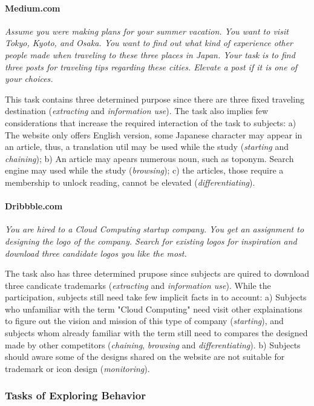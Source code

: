 \paragraph{Medium.com} \emph{Assume you were making plans for your summer vacation. 
        You want to visit Tokyo, Kyoto, and Osaka. You want to find out what kind of experience other people made 
        when traveling to these three places in Japan. Your task is to find three posts 
        for traveling tips regarding these cities. Elevate a post if it is one of your choices.}

This task contains three determined purpose since there are three fixed traveling 
destination (\emph{extracting} and \emph{information use}).
The task also implies few considerations that increase the required interaction of 
the task to subjects:
a) The website only offers English version, some Japanese character may appear in an article,
thus, a translation util may be used while the study (\emph{starting} and \emph{chaining});
b) An article may apears numerous noun, such as toponym. Search engine may used while the study (\emph{browsing});
c) the articles, those require a membership to unlock reading, cannot be elevated (\emph{differentiating}). 

\paragraph{Dribbble.com} \emph{You are hired to a Cloud Computing startup company. You get an assignment to 
        designing the logo of the company. Search for existing logos for inspiration and 
        download three candidate logos you like the most.}

The task also has three determined prupose since subjects are quired to download three candicate trademarks (\emph{extracting} and \emph{information use}).
While the participation, subjects still need take few implicit facts in to account:
a) Subjects who unfamiliar with the term "Cloud Computing" need visit other explainations to figure out
the vision and mission of this type of company (\emph{starting}), and subjects whom already familiar with the term
still need to compares the designed made by other competitors (\emph{chaining}, \emph{browsing} and \emph{differentiating}).
b) Subjects should aware some of the designs shared on the website are not suitable for trademark or icon design (\emph{monitoring}).

\subsubsection{Tasks of Exploring Behavior}

